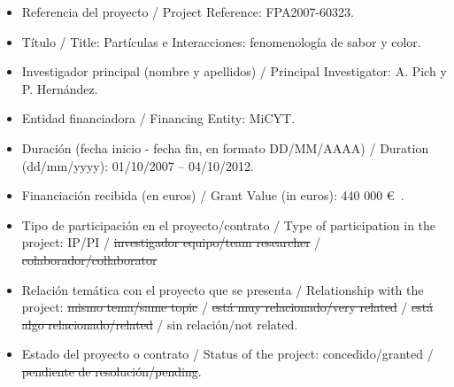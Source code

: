 \vspace{24pt}

\begin{itemize}
\item Referencia del proyecto / Project Reference: FPA2007-60323.
\item T\'itulo / Title: Part\'iculas e Interacciones: fenomenolog\'ia de sabor y color.
\item Investigador principal (nombre y apellidos) / Principal Investigator: A. Pich y P. Hern\'andez.
\item Entidad financiadora / Financing Entity: MiCYT.
\item Duraci\'on (fecha inicio - fecha fin, en formato DD/MM/AAAA) / Duration (dd/mm/yyyy): 01/10/2007 -- 04/10/2012.
\item Financiaci\'on recibida (en euros) / Grant Value (in euros): 440 000 \euro\ .
\item Tipo de participaci\'on en el proyecto/contrato / Type of participation in the project: IP/PI / \st{investigador equipo/team researcher} / \st{colaborador/collaborator}
\item Relaci\'on tem\'atica con el proyecto que se presenta  /  Relationship with the project: \st{mismo tema/same topic} / \st{est\'a muy relacionado/very related} / \st{est\'a algo relacionado/related} / sin relaci\'on/not related.
\item Estado del proyecto o contrato / Status of the project: concedido/granted   /  \st{pendiente de resoluci\'on/pending}.
\end{itemize}

